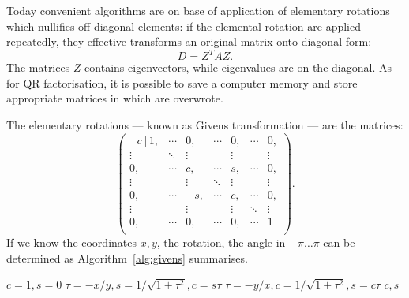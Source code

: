 \begin{refsection}
Today convenient algorithms are on base of application of elementary
rotations which nullifies off-diagonal elements: if the elemental rotation
are applied repeatedly, they effective transforms an original matrix
onto diagonal form:
\begin{equation}
  D = Z^T A Z.
\end{equation}
The matrices $Z$ contains eigenvectors, while eigenvalues are
on the diagonal. As for QR factorisation, it is possible to
save a computer memory and store appropriate matrices in which
are overwrote.




The elementary rotations --- known as Givens transformation ---
are the matrices:
\begin{equation}
  \begin{pmatrix*}[c]
    1,     & \cdots & 0,     & \cdots & 0,     & \cdots & 0,\\
    \vdots & \ddots & \vdots & {}     & \vdots & {}     & \vdots\\
    0,     & \cdots & c,     & \cdots & s,     & \cdots & 0,\\
    \vdots & {}     & \vdots & \ddots & \vdots & {}     & \vdots\\
    0,     & \cdots & -s,    & \cdots & c,     & \cdots & 0,\\
    \vdots & {}     & \vdots & {}     &\vdots  & \ddots & \vdots\\
    0,     & \cdots & 0,     & \cdots & 0,     & \cdots & 1\\
  \end{pmatrix*}.
\end{equation}
If we know the coordinates $x,y$, the rotation, the angle in $-\pi \ldots \pi$
can be determined as Algorithm~\ref{alg:givens} summarises.

\begin{algorithm}
  \caption{Givens rotation}
  \label{alg:givens}
  \begin{algorithmic}
    \State $c = 1, s = 0$
    \Else
    \State $\tau = -x/y, s = 1 / \sqrt{1 + \tau^2}, c = s \tau$
    \Else
    \State $\tau = -y/x, c = 1 / \sqrt{1 + \tau^2}, s = c \tau$
    \EndIf
    \EndIf
    \State \Return $c,s$
    \EndFunction
  \end{algorithmic}
\end{algorithm}






\end{refsection}
